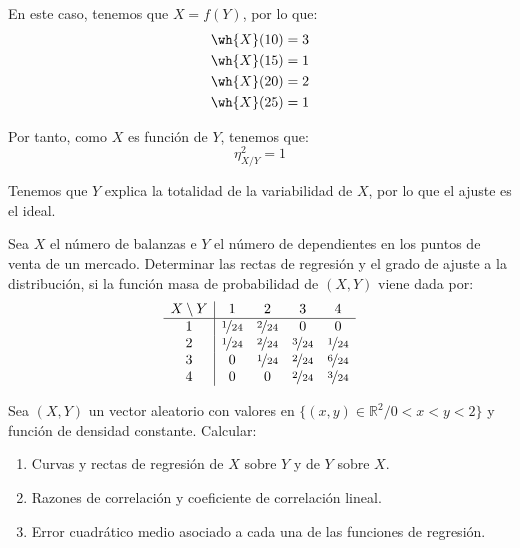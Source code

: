 \begin{ejercicio}
\begin{enumerate}
\begin{itemize}
            En este caso, tenemos que $X=f(Y)$, por lo que:
            \begin{align*}
                \wh{X}(10) &= 3\\
                \wh{X}(15) &= 1\\
                \wh{X}(20) &= 2\\
                \wh{X}(25) &= 1
            \end{align*}

            Por tanto, como $X$ es función de $Y$, tenemos que:
            \begin{equation*}
                \eta^2_{X/Y} = 1
            \end{equation*}

            Tenemos que $Y$ explica la totalidad de la variabilidad de $X$, por lo que el ajuste es el ideal.
        \end{itemize}


    \end{enumerate}
\end{ejercicio}

\begin{ejercicio}
    Sea $X$ el número de balanzas e $Y$ el número de dependientes en los puntos de venta de un mercado. Determinar las rectas de regresión y el grado de ajuste a la distribución, si la función masa de probabilidad de $(X,Y)$ viene dada por:
    \begin{equation*}
        \begin{array}{c|cccc}
            X\setminus Y & 1 & 2 & 3 & 4\\
            \hline
            1 & \nicefrac{1}{24} & \nicefrac{2}{24} & 0 & 0\\
            2 & \nicefrac{1}{24} & \nicefrac{2}{24} & \nicefrac{3}{24} & \nicefrac{1}{24}\\
            3 & 0 & \nicefrac{1}{24} & \nicefrac{2}{24} & \nicefrac{6}{24}\\
            4 & 0 & 0 & \nicefrac{2}{24} & \nicefrac{3}{24}
        \end{array}
    \end{equation*}
\end{ejercicio}

\begin{ejercicio}
    Sea $(X,Y)$ un vector aleatorio con valores en $\{(x, y) \in \mathbb{R}^2/0 < x < y < 2\}$ y función de densidad constante. Calcular:
    \begin{enumerate}
        \item Curvas y rectas de regresión de $X$ sobre $Y$ y de $Y$ sobre $X$.
        \item Razones de correlación y coeficiente de correlación lineal.
        \item Error cuadrático medio asociado a cada una de las funciones de regresión.
    \end{enumerate}
\end{ejercicio}

